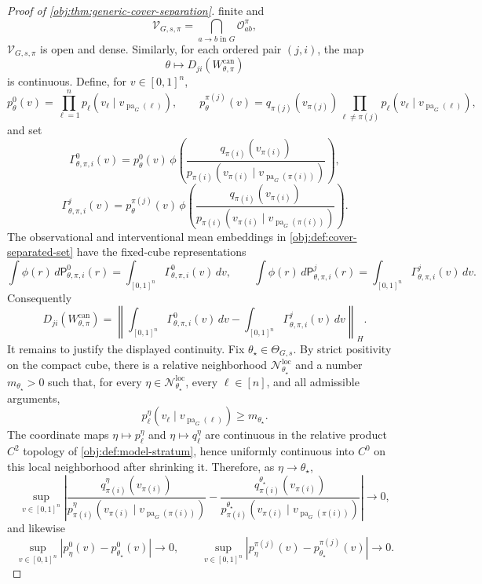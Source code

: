 \begin{proof}[Proof of \cref{obj:thm:generic-cover-separation}]
finite and
\[
\mathcal V_{G,s,\pi}
=
\bigcap_{a\to b\text{ in }G}\mathcal O^\pi_{ab},
\]
\(\mathcal V_{G,s,\pi}\) is open and dense.  Similarly, for each ordered pair \((j,i)\), the map
\[
\theta\longmapsto
D_{ji}\!\left(W_{\theta,\pi}^{\mathrm{can}}\right)
\]
is continuous.  Define, for \(v\in[0,1]^n\),
\[
p^0_\theta(v)=
\prod_{\ell=1}^n
p_\ell(v_\ell\mid v_{\operatorname{pa}_G(\ell)}),
\qquad
p^{\pi(j)}_\theta(v)=
q_{\pi(j)}(v_{\pi(j)})
\prod_{\ell\ne \pi(j)}
p_\ell(v_\ell\mid v_{\operatorname{pa}_G(\ell)}),
\]
and set
\[
\Gamma^0_{\theta,\pi,i}(v)
=
p^0_\theta(v)\,
\phi\!\left(
\frac{q_{\pi(i)}(v_{\pi(i)})}
     {p_{\pi(i)}(v_{\pi(i)}\mid v_{\operatorname{pa}_G(\pi(i))})}
\right),
\]
\[
\Gamma^j_{\theta,\pi,i}(v)
=
p^{\pi(j)}_\theta(v)\,
\phi\!\left(
\frac{q_{\pi(i)}(v_{\pi(i)})}
     {p_{\pi(i)}(v_{\pi(i)}\mid v_{\operatorname{pa}_G(\pi(i))})}
\right).
\]
The observational and interventional mean embeddings in
\cref{obj:def:cover-separated-set} have the fixed-cube representations
\[
\int \phi(r)\,d\mathsf P^0_{\theta,\pi,i}(r)
=
\int_{[0,1]^n}\Gamma^0_{\theta,\pi,i}(v)\,dv,
\qquad
\int \phi(r)\,d\mathsf P^j_{\theta,\pi,i}(r)
=
\int_{[0,1]^n}\Gamma^j_{\theta,\pi,i}(v)\,dv.
\]
Consequently
\[
D_{ji}\!\left(W_{\theta,\pi}^{\mathrm{can}}\right)
=
\left\|
\int_{[0,1]^n}\Gamma^0_{\theta,\pi,i}(v)\,dv
-
\int_{[0,1]^n}\Gamma^j_{\theta,\pi,i}(v)\,dv
\right\|_H .
\]
It remains to justify the displayed continuity.  Fix
\(\theta_\star\in\Theta_{G,s}\).  By strict positivity on the compact cube,
there is a relative neighborhood \(\mathcal N_{\theta_\star}^{\mathrm{loc}}\)
and a number \(m_{\theta_\star}>0\) such that, for every
\(\eta\in\mathcal N_{\theta_\star}^{\mathrm{loc}}\), every \(\ell\in[n]\), and
all admissible arguments,
\[
p_\ell^\eta(v_\ell\mid v_{\operatorname{pa}_G(\ell)})
\ge m_{\theta_\star}.
\]
The coordinate maps \(\eta\mapsto p_\ell^\eta\) and
\(\eta\mapsto q_\ell^\eta\) are continuous in the relative product \(C^2\)
topology of \cref{obj:def:model-stratum}, hence uniformly continuous into
\(C^0\) on this local neighborhood after shrinking it.  Therefore, as
\(\eta\to\theta_\star\),
\[
\sup_{v\in[0,1]^n}
\left|
\frac{q_{\pi(i)}^\eta(v_{\pi(i)})}
     {p_{\pi(i)}^\eta(v_{\pi(i)}\mid v_{\operatorname{pa}_G(\pi(i))})}
-
\frac{q_{\pi(i)}^{\theta_\star}(v_{\pi(i)})}
     {p_{\pi(i)}^{\theta_\star}(v_{\pi(i)}\mid v_{\operatorname{pa}_G(\pi(i))})}
\right|
\longrightarrow0,
\]
and likewise
\[
\sup_{v\in[0,1]^n}|p^0_\eta(v)-p^0_{\theta_\star}(v)|\longrightarrow0,
\qquad
\sup_{v\in[0,1]^n}|p^{\pi(j)}_\eta(v)-p^{\pi(j)}_{\theta_\star}(v)|
\longrightarrow0.
\]
\end{proof}

